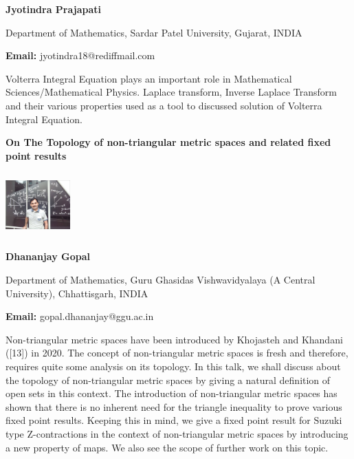 \documentclass[twoside,11pt]{amsart}
\begin{document}
\centerline{\textbf{  Jyotindra Prajapati }}
\vskip 2mm
\begin{flushleft}
Department of Mathematics, Sardar Patel University, Gujarat, INDIA
\end{flushleft}
\vskip 2mm
\begin{flushleft}
{\bf Email:} jyotindra18@rediffmail.com
\end{flushleft}

\vskip 8mm
Volterra Integral Equation plays an important role in Mathematical Sciences/Mathematical Physics. Laplace transform, Inverse Laplace Transform and their various properties used as a tool to discussed solution of Volterra Integral Equation.
\vskip 5mm
\newpage
\vskip 10mm
\begin{center}\bf\LARGE
On The Topology of non-triangular metric spaces and related fixed point results
\end{center}
\vskip 5mm
\begin{center}
\includegraphics[width=2.5cm, height=2.5cm, keepaspectratio=false]{DG2.jpg}
\end{center}
\vskip 2mm

\centerline{\textbf{  Dhananjay Gopal }}
\vskip 5mm
\begin{flushleft}
Department of Mathematics, Guru Ghasidas Vishwavidyalaya (A Central University), Chhattisgarh, INDIA
\end{flushleft}
\vskip 5mm
\begin{flushleft}
{\bf Email:} gopal.dhananjay@ggu.ac.in
\end{flushleft}

\vskip 10mm
Non-triangular metric spaces have been introduced by Khojasteh and Khandani ([13]) in 2020. The concept of non-triangular metric spaces is fresh and therefore, requires quite some analysis on its topology. In this talk, we shall discuss about the topology of non-triangular metric spaces by giving a natural definition of open sets in this context. The introduction of non-triangular metric spaces has shown that there is no inherent need for the triangle inequality to prove various fixed point results. Keeping this in mind, we give a fixed point result for Suzuki type Z-contractions in the context of non-triangular metric spaces by introducing a new property of maps. We also see the scope of further work on this topic.
\vskip 5mm
\newpage
\end{document}
